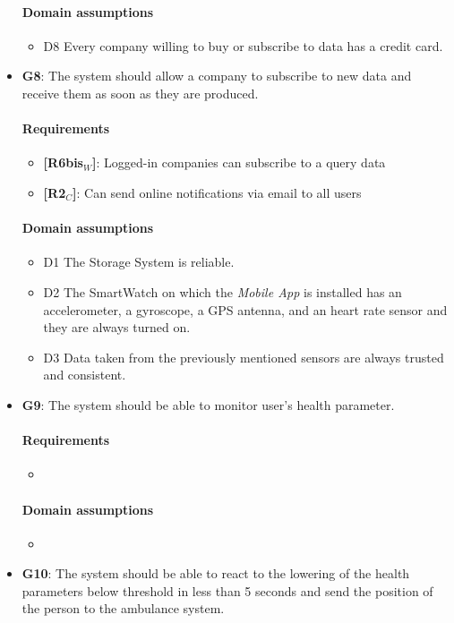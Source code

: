 \begin{itemize}
   \paragraph{Domain assumptions}
   \begin{itemize}
       \item  D8  Every company willing to buy or subscribe to data has a credit card.
   \end{itemize}
   
    \item \textbf{G8}: The system should allow a company to subscribe to new data and receive them as soon as they are produced.
    \paragraph{Requirements}
   \begin{itemize}
       \item \textbf{[R6bis$_W$]}: Logged-in companies can subscribe to a query data
       \item \textbf{[R2$_C$]}: Can send online notifications via email to all users
   \end{itemize}
   \paragraph{Domain assumptions}
   \begin{itemize}
        \item  D1  The Storage System is reliable.
    
        \item  D2  The SmartWatch on which the \textit{Mobile App} is installed has an accelerometer, a gyroscope, a GPS antenna, and an heart rate sensor and they are always turned on.
    
        \item  D3  Data taken from the previously mentioned sensors are always trusted and consistent.
   \end{itemize}
   
    \item \textbf{G9}: The system should be able to monitor user's health parameter.
    \paragraph{Requirements}
   \begin{itemize}
       \item 
   \end{itemize}
   \paragraph{Domain assumptions}
   \begin{itemize}
       \item 
   \end{itemize}
    \item \textbf{G10}: The system should be able to react to the lowering of the health parameters below threshold in less than 5 seconds and send the position of the person to the ambulance system. 

\end{itemize}
